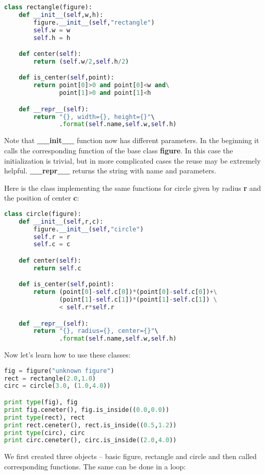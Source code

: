 \begin{lstlisting}[language=Python,style=codelst2,caption={Python: derived class (rectangle)}]
class rectangle(figure):
    def __init__(self,w,h):
        figure.__init__(self,"rectangle")
        self.w = w
        self.h = h

    def center(self):
        return (self.w/2,self.h/2)

    def is_center(self,point):
        return point[0]>0 and point[0]<w and\
               point[1]>0 and point[1]<h

    def __repr__(self):
        return "{}, width={}, height={}"\
               .format(self.name,self.w,self.h)
\end{lstlisting}
Note that \textbf{\_\_init\_\_} function now has different
parameters. In the beginning it calls the corresponding function
of the base class \textbf{figure}. In this case the initialization
is trivial, but in more complicated cases the reuse may be
extremely helpful. \textbf{\_\_repr\_\_} returns the string with
name and parameters.

Here is the class implementing the same functions for circle given
by radius \textbf{r} and the position of center \textbf{c}:

\begin{lstlisting}[language=Python,style=codelst2,caption={Python: derived class (circle)}]
class circle(figure):
    def __init__(self,r,c):
        figure.__init__(self,"circle")
        self.r = r
        self.c = c

    def center(self):
        return self.c

    def is_center(self,point):
        return (point[0]-self.c[0])*(point[0]-self.c[0])+\
               (point[1]-self.c[1])*(point[1]-self.c[1]) \
               < self.r*self.r

    def __repr__(self):
        return "{}, radius={}, center={}"\
               .format(self.name,self.w,self.h)
\end{lstlisting}
Now let's learn how to use these classes:

\begin{lstlisting}[language=Python,style=codelst2,caption={Python: using classes}]
fig = figure("unknown figure")
rect = rectangle(2.0,1.0)
circ = circle(3.0, (1.0,4.0))

print type(fig), fig
print fig.ceneter(), fig.is_inside((0.0,0.0))
print type(rect), rect
print rect.ceneter(), rect.is_inside((0.5,1.2))
print type(circ), circ
print circ.ceneter(), circ.is_inside((2.0,4.0))
\end{lstlisting}
We first created three objects -- basic figure, rectangle and circle and then
called corresponding functions. The same can be done in a loop:

